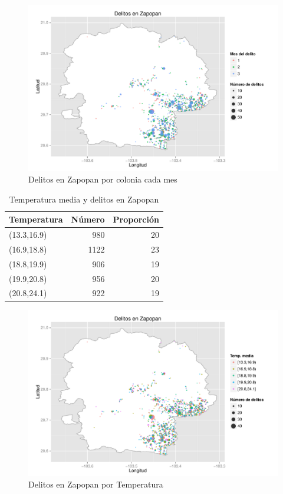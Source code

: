 \begin{figure}[H]
\centering
\caption{Delitos en Zapopan por colonia cada mes}
\includegraphics[width=120mm]{../../graphs/num_delitos_mes.pdf}
\end{figure}


\begin{table}[H]
\centering
\caption{Temperatura media y delitos en Zapopan}
\begin{tabular}{lrr}
  \hline
Temperatura & Número & Proporción \\ 
  \hline
(13.3,16.9) & 980 & 20 \\ 
  (16.9,18.8) & 1122 & 23 \\ 
  (18.8,19.9) & 906 & 19 \\ 
  (19.9,20.8) & 956 & 20 \\ 
  (20.8,24.1) & 922 & 19 \\ 
   \hline
\end{tabular}
\end{table}


\begin{figure}[H]
\centering
\caption{Delitos en Zapopan por Temperatura}
\includegraphics[width=120mm]{../../graphs/temperatura.pdf}
\end{figure}

